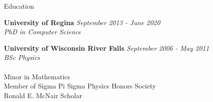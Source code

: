 \documentclass{resume} %
\begin{document}
{\centerline {}}

\begin{rSection}{Education}

{\bf University of Regina} \hfill {\em September 2013 - June 2020} 
\\{ \textit {PhD in Computer Science }} 

{\bf University of Wisconsin River Falls} \hfill {\em September 2006 - May 2011} 
\\ { \textit {BSc Physics}} \hfill \\ \\
\small Minor in Mathematics \smallskip \\
\small Member of Sigma Pi Sigma Physics Honors Society \\
\small Ronald E. McNair Scholar

\end{rSection}
\end{document}
